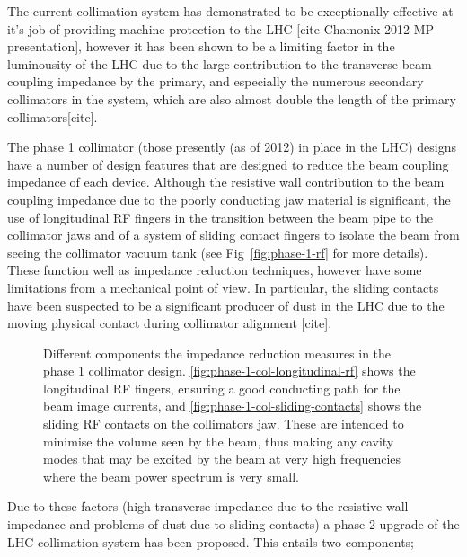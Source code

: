 The current collimation system has demonstrated to be exceptionally effective at it's job of providing machine protection to the LHC [cite Chamonix 2012 MP presentation], however it has been shown to be a limiting factor in the luminousity of the LHC due to the large contribution to the transverse beam coupling impedance by the primary, and especially the numerous secondary collimators in the system, which are also almost double the length of the primary collimators[cite]. 

The phase 1 collimator (those presently (as of 2012) in place in the LHC) designs have a number of design features that are designed to reduce the beam coupling impedance of each device. Although the resistive wall contribution to the beam coupling impedance due to the poorly conducting jaw material is significant, the use of longitudinal RF fingers in the transition between the beam pipe to the collimator jaws and of a system of sliding contact fingers to isolate the beam from seeing the collimator vacuum tank (see Fig~\ref{fig:phase-1-rf} for more details). These function well as impedance reduction techniques, however have some limitations from a mechanical point of view. In particular, the sliding contacts have been suspected to be a significant producer of dust in the LHC due to the moving physical contact during collimator alignment [cite]. 

\begin{figure}
\subfigure[]{
\label{fig:phase-1-col-longitudinal-rf}
}
\subfigure[]{
\label{fig:phase-1-col-sliding-contacts}
}
\label{fig:pĥase-1-rf}
\caption{Different components the impedance reduction measures in the phase 1 collimator design. \ref{fig:phase-1-col-longitudinal-rf} shows the longitudinal RF fingers, ensuring a good conducting path for the beam image currents, and \ref{fig:phase-1-col-sliding-contacts} shows the sliding RF contacts on the collimators jaw. These are intended to minimise the volume seen by the beam, thus making any cavity modes that may be excited by the beam at very high frequencies where the beam power spectrum is very small.}
\end{figure}

Due to these factors (high transverse impedance due to the resistive wall impedance and problems of dust due to sliding contacts) a phase 2 upgrade of the LHC collimation system has been proposed. This entails two components;

